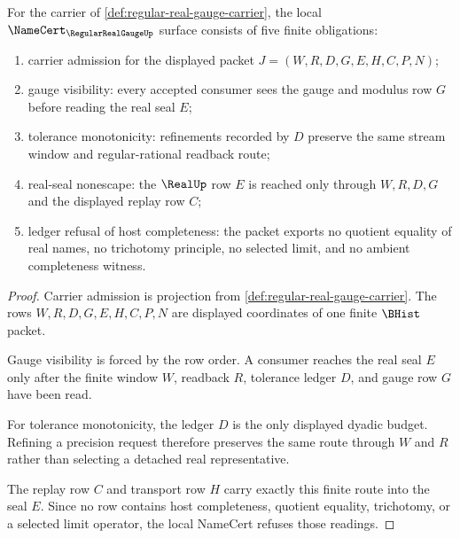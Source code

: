 \begin{theorem}
\label{thm:regular-real-gauge-namecert-obligations}
For the carrier of \autoref{def:regular-real-gauge-carrier}, the local $\NameCert_{\RegularRealGaugeUp}$ surface consists of five finite obligations:
\begin{enumerate}
\item carrier admission for the displayed packet $J=(W,R,D,G,E,H,C,P,N)$;
\item gauge visibility: every accepted consumer sees the gauge and modulus row $G$ before reading the real seal $E$;
\item tolerance monotonicity: refinements recorded by $D$ preserve the same stream window and regular-rational readback route;
\item real-seal nonescape: the $\RealUp$ row $E$ is reached only through $W,R,D,G$ and the displayed replay row $C$;
\item ledger refusal of host completeness: the packet exports no quotient equality of real names, no trichotomy principle, no selected limit, and no ambient completeness witness.
\end{enumerate}
\end{theorem}
\begin{proof}
Carrier admission is projection from \autoref{def:regular-real-gauge-carrier}. The rows $W,R,D,G,E,H,C,P,N$ are displayed coordinates of one finite $\BHist$ packet.

Gauge visibility is forced by the row order. A consumer reaches the real seal $E$ only after the finite window $W$, readback $R$, tolerance ledger $D$, and gauge row $G$ have been read.

For tolerance monotonicity, the ledger $D$ is the only displayed dyadic budget. Refining a precision request therefore preserves the same route through $W$ and $R$ rather than selecting a detached real representative.

The replay row $C$ and transport row $H$ carry exactly this finite route into the seal $E$. Since no row contains host completeness, quotient equality, trichotomy, or a selected limit operator, the local NameCert refuses those readings.
\end{proof}

